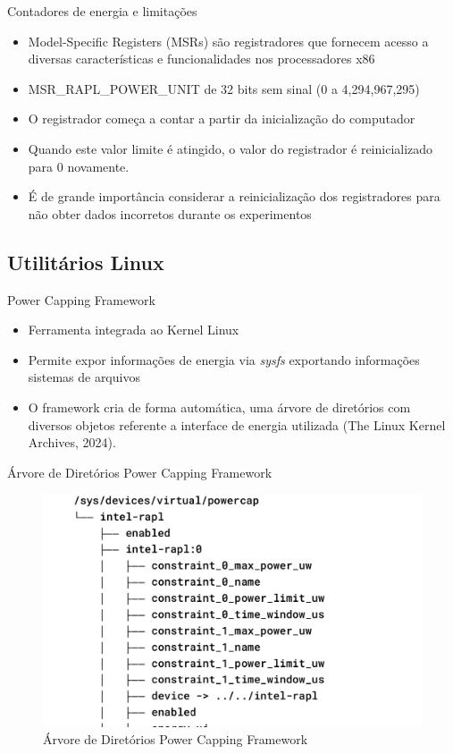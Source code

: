 \begin{frame}{Contadores de energia e limitações}
    \begin{itemize}
        \item Model-Specific Registers (MSRs) são registradores
        que fornecem acesso a diversas características e funcionalidades nos processadores x86
        \item MSR\_RAPL\_POWER\_UNIT de 32 bits sem sinal (0 a 4,294,967,295) 
        \item O registrador começa a contar a partir da inicialização do computador
        \item Quando este valor limite é atingido, o valor do registrador é reinicializado para 0 novamente.
        \item É de grande importância considerar a reinicialização
        dos registradores para não obter dados incorretos durante os experimentos
    \end{itemize}
\end{frame}

\subsection{Utilitários Linux}
\begin{frame}{Power Capping Framework}
    \begin{itemize}
        \item Ferramenta integrada ao Kernel Linux
        \item Permite expor informações de energia via \emph{sysfs} exportando informações sistemas de arquivos
        \item O framework cria de forma automática, uma árvore de diretórios com
        diversos objetos referente a interface de energia utilizada (The Linux Kernel Archives, 2024).
    \end{itemize}
\end{frame}

\begin{frame}{Árvore de Diretórios Power Capping Framework}
    \begin{figure}
        \centering
        \includegraphics[width=0.65\linewidth]{images/powercap-tree.png}
        \caption{Árvore de Diretórios Power Capping Framework}
        \label{fig:powercap-tree}
    \end{figure}
\end{frame}

